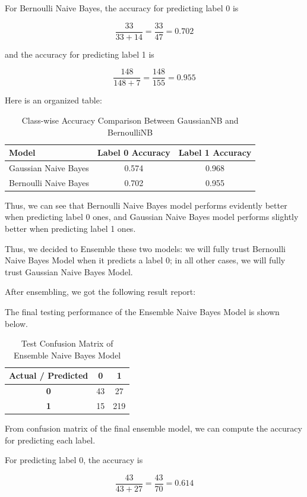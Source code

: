 \documentclass{article}
\begin{document}
For Bernoulli Naive Bayes, the accuracy for predicting label 0 is

\[
\frac{33}{33+14} = \frac{33}{47} = 0.702
\]

and the accuracy for predicting label 1 is

\[
\frac{148}{148+7} = \frac{148}{155} = 0.955
\]

Here is an organized table:

\begin{table}[h]
\centering
\caption{Class-wise Accuracy Comparison Between GaussianNB and BernoulliNB}
\begin{tabular}{lcc}
\hline
Model & Label 0 Accuracy & Label 1 Accuracy \\
\hline
Gaussian Naive Bayes & 0.574 & 0.968 \\
Bernoulli Naive Bayes & 0.702 & 0.955 \\
\hline
\end{tabular}
\end{table}

Thus, we can see that Bernoulli Naive Bayes model performs evidently better
when predicting label 0 ones, and Gaussian Naive Bayes model performs
slightly better when predicting label 1 ones.

Thus, we decided to Ensemble these two models: we will fully trust Bernoulli
Naive Bayes Model when it predicts a label 0; in all other cases, we will fully trust Gaussian Naive Bayes Model.

After ensembling, we got the following result report:

The final testing performance of the Ensemble Naive Bayes Model is shown below.

\begin{table}[h]
\centering
\caption{Test Confusion Matrix of Ensemble Naive Bayes Model}
\begin{tabular}{c|cc}
\hline
\textbf{Actual / Predicted} & \textbf{0} & \textbf{1} \\
\hline
\textbf{0} & 43 & 27 \\
\textbf{1} & 15 & 219 \\
\hline
\end{tabular}
\end{table}

From confusion matrix of the final ensemble model,
we can compute the accuracy for predicting each label.

For predicting label 0, the accuracy is

\[
\frac{43}{43+27}=\frac{43}{70}=0.614
\]
\end{document}
